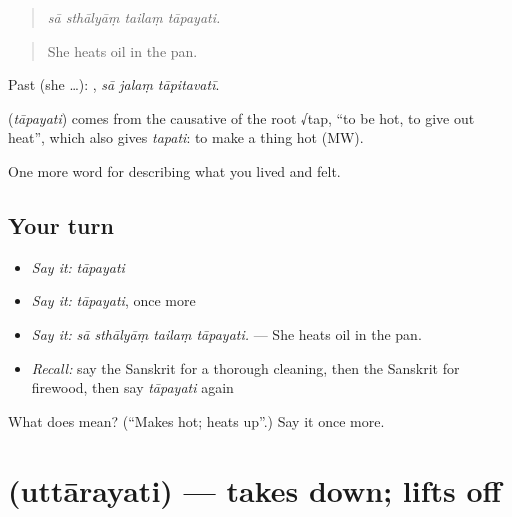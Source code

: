 \begin{quote}
   
\end{quote}

\begin{quote}
\emph{sā sthālyāṃ tailaṃ tāpayati.}
\end{quote}

\begin{quote}
She heats oil in the pan.
\end{quote}

Past (she …):   , \emph{sā jalaṃ tāpitavatī}.

\begin{cousinweb}
\textbf{} (\emph{tāpayati}) comes from the causative of the root √tap, \textquotedblleft{}to be hot, to give out heat\textquotedblright{}, which also gives \emph{tapati}: to make a thing hot (MW).
\end{cousinweb}

\begin{grammarlens}[title={What you've built}]
One more word for describing what you lived and felt.
\end{grammarlens}

\subsection*{Your turn}
\begin{itemize}
\raggedright
  \item \emph{Say it:} \emph{tāpayati}
  \item \emph{Say it:} \emph{tāpayati}, once more
  \item \emph{Say it:} \emph{sā sthālyāṃ tailaṃ tāpayati.} — She heats oil in the pan.
  \item \emph{Recall:} say the Sanskrit for a thorough cleaning, then the Sanskrit for firewood, then say \emph{tāpayati} again
\end{itemize}

\begin{tcolorbox}[breakable,colback=teal!4,colframe=teal!35!black,title={Before you move on}]
What does  mean? (\textquotedblleft{}Makes hot; heats up\textquotedblright{}.) Say it once more.
\end{tcolorbox}
\section[\texorpdfstring{\sk{उत्तारयति} (uttārayati)}{उत्तारयति (uttārayati)}]{ (uttārayati) — takes down; lifts off}

